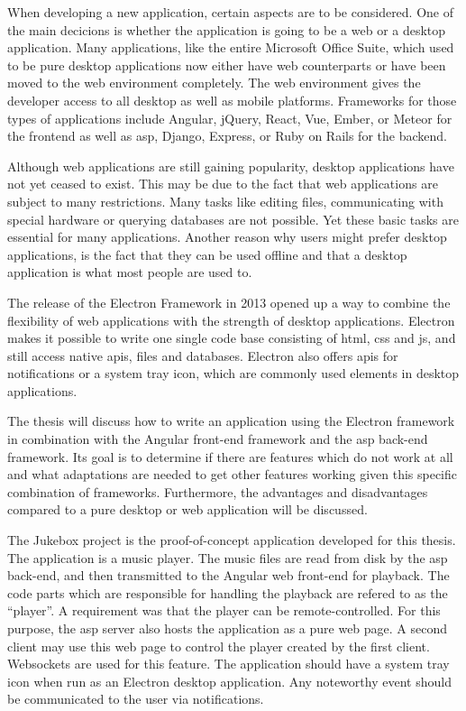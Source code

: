 
When developing a new application, certain aspects are to be considered. One of the main decicions is whether the application is going to be a web or a desktop application. Many applications, like the entire Microsoft Office Suite, which used to be pure desktop applications now either have web counterparts or have been moved to the web environment completely. The web environment gives the developer access to all desktop as well as mobile platforms. Frameworks for those types of applications include Angular, jQuery, React, Vue, Ember, or Meteor for the frontend as well as \gls{asp}, Django, Express, or Ruby on Rails for the backend.

Although web applications are still gaining popularity, desktop applications have not yet ceased to exist. This may be due to the fact that web applications are subject to many restrictions. Many tasks like editing files, communicating with special hardware or querying databases are not possible. Yet these basic tasks are essential for many applications. Another reason why users might prefer desktop applications, is the fact that they can be used offline and that a desktop application is what most people are used to.

The release of the Electron Framework in 2013 opened up a way to combine the flexibility of web applications with the strength of desktop applications. Electron makes it possible to write one single code base consisting of \gls{html}, \gls{css} and \gls{js}, and still access native \glspl{api}, files and databases. Electron also offers \glspl{api} for notifications or a system tray icon, which are commonly used elements in desktop applications.

The thesis will discuss how to write an application using the Electron framework in combination with the Angular front-end framework and the \gls{asp} back-end framework. Its goal is to determine if there are features which do not work at all and what adaptations are needed to get other features working given this specific combination of frameworks. Furthermore, the advantages and disadvantages compared to a pure desktop or web application will be discussed.


The Jukebox project is the proof-of-concept application developed for this thesis. The application is a music player. The music files are read from disk by the \gls{asp} back-end, and then transmitted to the Angular web front-end for playback. The code parts which are responsible for handling the playback are refered to as the \enquote{player}. A requirement was that the player can be remote-controlled. For this purpose, the \gls{asp} server also hosts the application as a pure web page. A second client may use this web page to control the player created by the first client. Websockets are used for this feature. The application should have a system tray icon when run as an Electron desktop application. Any noteworthy event should be communicated to the user via notifications.

